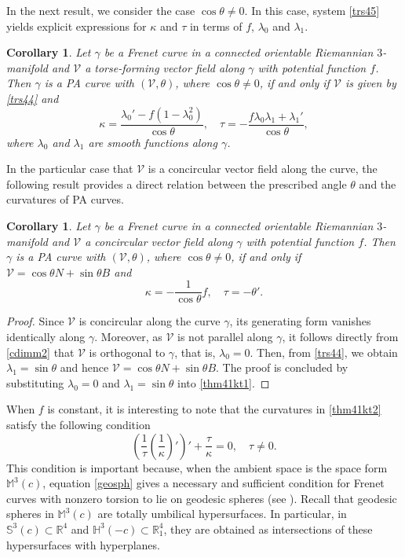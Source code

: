 \documentclass[12pt]{amsart}
\def\r{\mathbb R}
\def\m{\mathbb M}
\def\s{\mathbb S}
\def\h{\mathbb H}
\def\v{\mathcal V}
\newtheorem{corollary}[theorem]{Corollary}
\theoremstyle{definition}
\begin{document}
In the next result, we consider the case $\cos \theta \neq 0$. In this case, system \eqref{trs45} yields explicit expressions for $\kappa$ and $\tau$ in terms of $f$, $\lambda_0$ and $\lambda_1$.

\begin{corollary}\label{thm43}
Let $\gamma$ be a Frenet curve in a connected orientable Riemannian $3$-manifold and $\v$ a torse-forming vector field along $\gamma$ with potential function $f$. Then $\gamma$ is a PA curve with $(\v,\theta)$, where $\cos \theta \neq 0$, if and only if $\v$ is given by \eqref{trs44} and 
\begin{equation}\label{thm41kt1}
\kappa =\frac{\lambda_0'-f(1-\lambda_0^2)}{\cos\theta}, \quad \tau=-\frac{f\lambda_0\lambda_1+\lambda_1'}{\cos\theta},
\end{equation}
where $\lambda_0$ and $\lambda_1$ are smooth functions along $\gamma$.
\end{corollary}

In the particular case that $\v$ is a concircular vector field along the curve, the following result provides a direct relation between the prescribed angle $\theta$ and the curvatures of PA curves.

\begin{corollary}\label{thm44}
Let $\gamma$ be a Frenet curve in a connected orientable Riemannian $3$-manifold and $\v$ a  concircular vector field along $\gamma$ with potential function $f$. Then $\gamma$ is a PA curve with $(\v,\theta)$, where $\cos \theta \neq 0$, if and only if $\v=\cos \theta N+\sin\theta B$ and
\begin{equation}
\kappa=-\dfrac{1}{\cos \theta } f, \quad \tau=- \theta'. \label{thm41kt2}
\end{equation}
\end{corollary}

\begin{proof}
Since $\v$ is concircular along the curve $\gamma$, its generating form vanishes identically along $\gamma$. Moreover, as $\v$ is not parallel along $\gamma$, it follows directly from \eqref{cdimm2} that $\v$ is orthogonal to $\gamma$, that is, $\lambda_0 = 0$. Then, from \eqref{trs44}, we obtain $\lambda_1 = \sin \theta$ and hence $\v=\cos \theta N+\sin\theta B$. The proof is concluded by substituting $\lambda_0 = 0$ and $\lambda_1 = \sin \theta$ into \eqref{thm41kt1}.
\end{proof}

When $f$ is constant, it is interesting to note that the curvatures in \eqref{thm41kt2} satisfy the following condition
\begin{equation}
\left (\frac{1}{\tau} \left (\frac{1}{\kappa} \right )'\right )'+\frac{\tau}{\kappa}=0, \quad \tau \neq 0. \label{geosph}
\end{equation}
This condition is important because, when the ambient space is the space form $\m^3(c)$, equation \eqref{geosph} gives a necessary and sufficient condition for Frenet curves with nonzero torsion to lie on geodesic spheres (see \cite[Theorem 4]{dgd1}). 
Recall that geodesic spheres in $\m^3(c)$ are totally umbilical hypersurfaces. In particular, in $\s^3(c)\subset \r^4$ and $\h^3(-c)\subset \r^4_1$, they are obtained as intersections of these hypersurfaces with hyperplanes.
\end{document}
